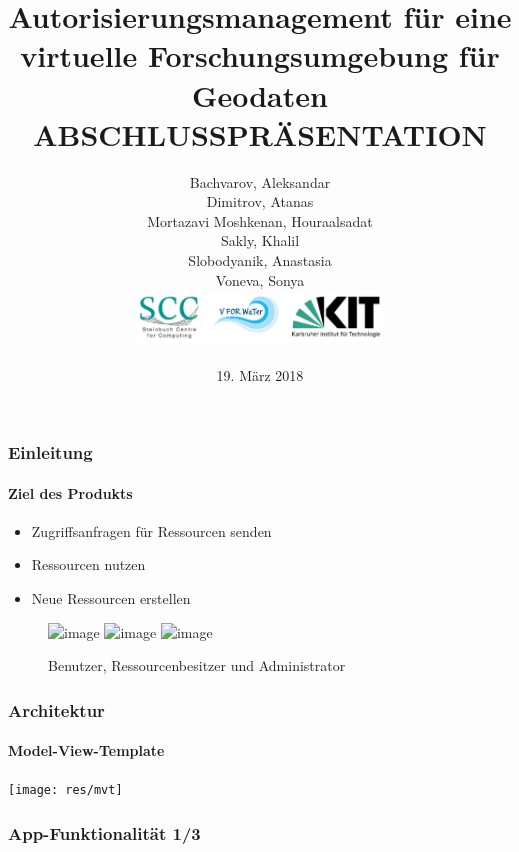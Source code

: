 \documentclass{beamer}
\title[Autorisierungsmanagement für eine virtuelle
Forschungsumgebung für Geodaten: Abschlusspräsentation]{Autorisierungsmanagement für eine virtuelle
Forschungsumgebung für Geodaten \\ \textbf{ABSCHLUSSPRÄSENTATION}} %
\author[]{
Bachvarov, Aleksandar\\
Dimitrov, Atanas\\
Mortazavi Moshkenan, Houraalsadat\\
Sakly, Khalil\\
Slobodyanik, Anastasia\\
Voneva, Sonya\\ \vspace{.75cm}
	\includegraphics[width=6.5cm, height=1.5cm]{res/logos} 
}
\date{19. März 2018} %
\begin{document}
\begin{frame}[plain]
\titlepage %
\end{frame}




\begin{frame}
\frametitle{Einleitung}
\framesubtitle{Ziel des Produkts}

\begin{itemize}
	\item<1-7> Zugriffsanfragen für Ressourcen senden
	\item<2-7> Ressourcen nutzen
	\item<3-7> Neue Ressourcen erstellen
\end{itemize}
	\begin{figure}
		
			\includegraphics<4-7>[height=2cm,width=2cm]{res/benutzer}
			\hspace{0.2cm}
			\includegraphics<5-7>[height=2cm,width=2cm]{res/ressbesitzer}
			\hspace{0.2cm}
			\includegraphics<6-7>[height=2cm,width=2cm]{res/admin}	
			\item<7>Benutzer, Ressourcenbesitzer und Administrator
			
	\end{figure}

\end{frame}
\begin{frame}

\frametitle{Architektur}
\framesubtitle{Model-View-Template}
\vspace{1cm}
\texttt{[image: res/mvt]}

\end{frame}
\begin{frame}
\frametitle{App-Funktionalität 1/3}
\begin{center}

\end{center}\end{frame}
\end{document}
